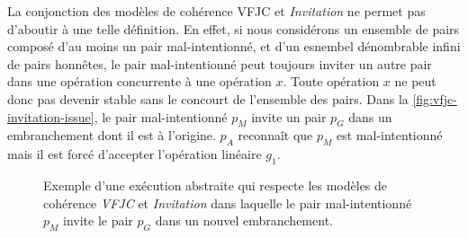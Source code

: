 La conjonction des modèles de cohérence \acs{VFJC} et \emph{Invitation} ne permet pas d'aboutir à une telle définition.
En effet, si nous considérons un ensemble de pairs composé d'au moins un pair mal-intentionné, et d'un esnembel dénombrable infini de pairs honnêtes, le pair mal-intentionné peut toujours inviter un autre pair dans une opération concurrente à une opération $x$.
Toute opération $x$ ne peut donc pas devenir stable sans le concourt de l'ensemble des pairs.
Dans la \autoref{fig:vfjc-invitation-issue}, le pair mal-intentionné $p_M$ invite un pair $p_G$ dans un embranchement dont il est à l'origine.
$p_A$ reconnaît que $p_M$ est mal-intentionné mais il est forcé d'accepter l'opération linéaire $g_1$.

\begin{figure}[htb]
\centering
{}
\caption{Exemple  d'une exécution abstraite qui respecte les modèles de cohérence \emph{VFJC} et \emph{Invitation} dans laquelle le pair mal-intentionné $p_M$ invite le pair $p_G$ dans un nouvel embranchement.}\label{fig:vfjc-invitation-issue}
\end{figure}


